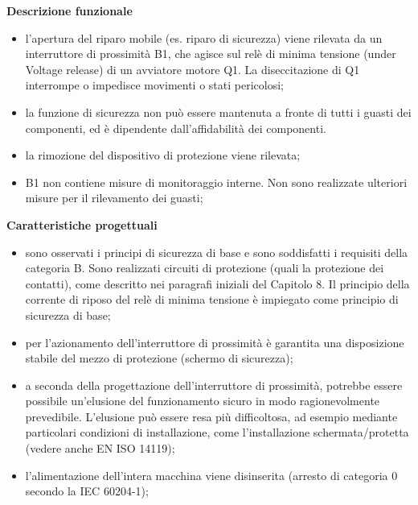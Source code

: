 \textbf{Descrizione funzionale}
\begin{itemize}
    \item l'apertura del riparo mobile (es. riparo di sicurezza) viene rilevata da un interruttore di prossimità B1, che agisce sul relè di minima tensione (under Voltage release) di un avviatore motore Q1. La diseccitazione di Q1 interrompe o impedisce movimenti o stati pericolosi;
    \item la funzione di sicurezza non può essere mantenuta a fronte di tutti i guasti dei componenti, ed è dipendente dall'affidabilità dei componenti.
    \item la rimozione del dispositivo di protezione viene rilevata;
    \item B1 non contiene misure di monitoraggio interne. Non sono realizzate ulteriori misure per il rilevamento dei guasti;
\end{itemize}

\textbf{Caratteristiche progettuali}
\begin{itemize}
    \item sono osservati i principi di sicurezza di base e sono soddisfatti i requisiti della categoria B. Sono realizzati circuiti di protezione (quali la protezione dei contatti), come descritto nei paragrafi iniziali del Capitolo 8. Il principio della corrente di riposo del relè di minima tensione è impiegato come principio di sicurezza di base;
    \item per l'azionamento dell'interruttore di prossimità è garantita una disposizione stabile del mezzo di protezione (schermo di sicurezza);
    \item a seconda della progettazione dell'interruttore di prossimità, potrebbe essere possibile un'elusione del funzionamento sicuro in modo ragionevolmente prevedibile. L'elusione può essere resa più difficoltosa, ad esempio mediante particolari condizioni di installazione, come l'installazione schermata/protetta (vedere anche EN ISO 14119);
    \item l'alimentazione dell'intera macchina viene disinserita (arresto di categoria 0 secondo la IEC 60204-1);
\end{itemize}

\begin{center}
    \begin{minipage}{\textwidth}
        \centering
        \captionsetup{hypcap=false}
        \resizebox{0.4\textwidth}{!}{}
        \label{fig:08-04}
    \end{minipage}
\end{center}

